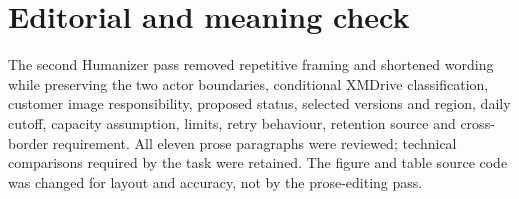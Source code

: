 \documentclass[a4paper,11pt]{article}
\begin{document}
\section*{Editorial and meaning check}
The second Humanizer pass removed repetitive framing and shortened wording while
preserving the two actor boundaries, conditional XMDrive classification,
customer image responsibility, proposed status, selected versions and region,
daily cutoff, capacity assumption, limits, retry behaviour, retention source and
cross-border requirement. All eleven prose paragraphs were reviewed; technical
comparisons required by the task were retained. The figure and table source code
was changed for layout and accuracy, not by the prose-editing pass.


\end{document}
